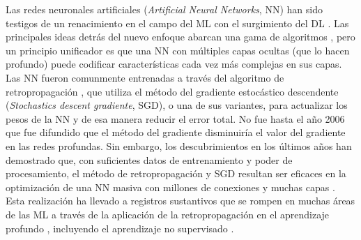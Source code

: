 

Las redes neuronales artificiales ({\em Artificial Neural Networks}, NN) han sido testigos de un renacimiento en el campo del ML con el surgimiento del DL \cite{Bengio2006, Hinton2006, Le2012, Ranzato2007}. Las principales ideas detrás del nuevo enfoque abarcan una gama de algoritmos \cite{Bengio2007, Hinton2006}, pero un principio unificador es que una NN con múltiples capas ocultas (que lo hacen profundo) puede codificar características cada vez más complejas en sus capas. Las NN fueron comunmente entrenadas a través del algoritmo de retropropagación \cite{Rumelhart1986b}, que utiliza el método del gradiente estocástico descendente ({\em Stochastics descent gradiente}, SGD), o una de sus variantes, para actualizar los pesos de la NN y de esa manera reducir el error total. No fue hasta el año 2006 que fue difundido que el método del gradiente disminuiría el valor del gradiente en las redes profundas. Sin embargo, los descubrimientos en los últimos años han demostrado que, con suficientes datos de entrenamiento y poder de procesamiento, el método de retropropagación y SGD resultan ser eficaces en la optimización de una NN masiva con millones de conexiones y muchas capas \cite{Ciresan2012, He2015, Le2012}. Esta realización ha llevado a registros sustantivos que se rompen en muchas áreas de las ML a través de la aplicación de la retropropagación en el aprendizaje profundo \cite{Ciresan2012, He2015, Le2012}, incluyendo el aprendizaje no supervisado \cite{Bengio2009}.




